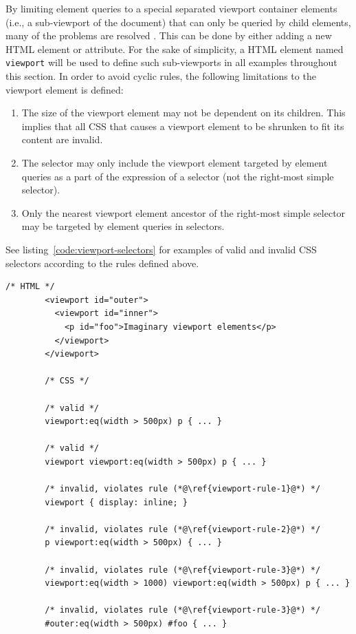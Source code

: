 \documentclass[a4paper,11pt]{kth-mag}
\newcommand{\code}[1]{\texttt{#1}}
\begin{document}
      By limiting element queries to a special separated viewport container \glspl{element} (i.e., a sub-viewport of the document) that can only be queried by child \glspl{element}, many of the problems are resolved \cite{w3c_eq_mail,ricg_irc_log,ricg_issue_viewport}.
      This can be done by either adding a new \gls{HTML} element or attribute.
      For the sake of simplicity, a \gls{HTML} element named \code{viewport} will be used to define such sub-viewports in all examples throughout this section.
      In order to avoid cyclic rules, the following limitations to the viewport element is defined:
      \begin{enumerate}
        \item\label{viewport-rule-1} The size of the viewport element may not be dependent on its children. This implies that all \gls{CSS} that causes a viewport \gls{element} to be shrunken to fit its content are invalid.
        \item\label{viewport-rule-2} The selector may only include the viewport \gls{element} targeted by element queries as a part of the expression of a selector (not the right-most simple selector).
        \item\label{viewport-rule-3} Only the nearest viewport element ancestor of the right-most simple selector may be targeted by element queries in selectors.
      \end{enumerate}
      See listing~\ref{code:viewport-selectors} for examples of valid and invalid CSS selectors according to the rules defined above.
      \begin{lstlisting}[gobble=8,caption={Examples of valid and invalid selectors with the viewport element.}, captionpos=b, label={code:viewport-selectors}]
        /* HTML */
        <viewport id="outer">
          <viewport id="inner">
            <p id="foo">Imaginary viewport elements</p>
          </viewport>
        </viewport>

        /* CSS */

        /* valid */
        viewport:eq(width > 500px) p { ... }

        /* valid */
        viewport viewport:eq(width > 500px) p { ... }

        /* invalid, violates rule (*@\ref{viewport-rule-1}@*) */
        viewport { display: inline; }

        /* invalid, violates rule (*@\ref{viewport-rule-2}@*) */
        p viewport:eq(width > 500px) { ... }

        /* invalid, violates rule (*@\ref{viewport-rule-3}@*) */
        viewport:eq(width > 1000) viewport:eq(width > 500px) p { ... }

        /* invalid, violates rule (*@\ref{viewport-rule-3}@*) */
        #outer:eq(width > 500px) #foo { ... }
      \end{lstlisting}
\end{document}
